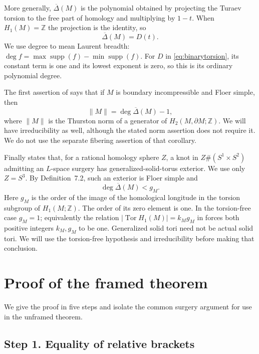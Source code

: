 \documentclass[11pt]{amsart}
\theoremstyle{definition}
\theoremstyle{remark}
\newcommand{\Z}{\mathbb Z}
\newcommand{\Tor}{\operatorname{Tor}}
\newcommand{\bd}{\partial}
\begin{document}
More generally, \(\overline\Delta(M)\) is the polynomial
obtained by projecting the Turaev torsion to the free
part of homology and multiplying by \(1-t\).
When \(H_1(M)=\Z\) the projection is the identity, so
\begin{equation}\label{eq:barD}
 \overline\Delta(M)=D(t).
\end{equation}
We use degree to mean Laurent breadth:
\(\deg f=\max\operatorname{supp}(f)-\min\operatorname{supp}(f)\).
For \(D\) in \eqref{eq:binarytorsion}, its constant term
is one and its lowest exponent is zero, so this is its
ordinary polynomial degree.

The first assertion of \cite[Corollary~2.3]{RR} says that
if \(M\) is boundary incompressible and Floer simple, then
\begin{equation}\label{eq:norm}
 \|M\|=\deg\overline\Delta(M)-1,
\end{equation}
where \(\|M\|\) is the Thurston norm of a generator of
\(H_2(M,\bd M;\Z)\). We will have irreducibility as well,
although the stated norm assertion does not require it.
We do not use the separate fibering assertion of that corollary.

Finally \cite[Proposition~7.8]{RR} states that, for a rational
homology sphere \(Z\), a knot in \(Z\#(S^1\times S^2)\)
admitting an \(L\)-space surgery has
generalized-solid-torus exterior. We use only \(Z=S^3\).
By Definition~7.2, such an exterior is Floer simple and
\[
 \deg\overline\Delta(M)<g_M.
\]
Here \(g_M\) is the order of the image of the homological
longitude in the torsion subgroup of \(H_1(M;\Z)\).
The order of its zero element is one. In the torsion-free
case \(g_M=1\); equivalently the relation
\(|\Tor H_1(M)|=k_Mg_M\) in \cite[Section~7, introductory notation]{RR}
forces both positive integers \(k_M,g_M\) to be one.
Generalized solid tori need not be actual solid tori.
We will use the torsion-free hypothesis and irreducibility
before making that conclusion.

\section{Proof of the framed theorem}\label{sec:framedproof}

We give the proof in five steps and isolate the common
surgery argument for use in the unframed theorem.

\subsection*{Step 1. Equality of relative brackets}
\end{document}
